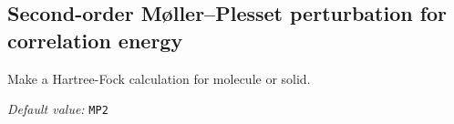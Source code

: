 \documentclass[11pt]{article}
\begin{document}
\vspace{5pt}
\subsection{Second-order M\o{}ller–Plesset perturbation for
correlation energy}
\begin{description}
\itemsep 10pt
\parsep 0pt

\item[{\bf MP2}] 
Make a Hartree-Fock calculation for molecule or solid.

{\it Default value:} {\tt MP2}

\end{description}


\







\printindex
\end{document}
